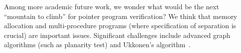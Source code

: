 Among more academic future work, we wonder what would be the next
``mountain to climb'' for pointer program verification? We think that
memory allocation and multi-procedure programs (where specification of
separation is crucial) are important issues. Significant challenges
include advanced graph algorithms (such as planarity test) and
Ukkonen's algorithm~\cite{ukkonen95}.



